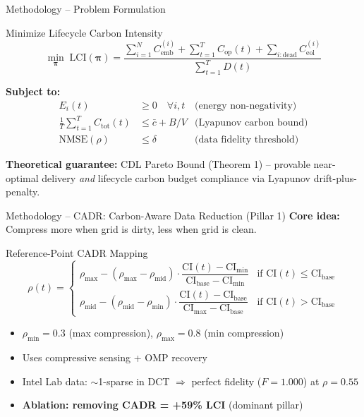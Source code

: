 \documentclass[aspectratio=169, 11pt]{beamer}
\begin{document}
\begin{frame}{Methodology -- Problem Formulation}
\begin{block}{Minimize Lifecycle Carbon Intensity}
\[
\min_{\boldsymbol{\pi}} \; \text{LCI}(\boldsymbol{\pi}) = \frac{\sum_{i=1}^{N} C_{\text{emb}}^{(i)} + \sum_{t=1}^{T} C_{\text{op}}(t) + \sum_{i:\text{dead}} C_{\text{eol}}^{(i)}}{\sum_{t=1}^{T} D(t)}
\]
\end{block}

\textbf{Subject to:}
\begin{align*}
    E_i(t) &\geq 0 \quad \forall i, t  &\text{(energy non-negativity)} \\
    \frac{1}{T}\sum_{t=1}^{T} C_{\text{tot}}(t) &\leq \bar{c} + B/V  &\text{(Lyapunov carbon bound)} \\
    \text{NMSE}(\rho) &\leq \delta \quad &\text{(data fidelity threshold)}
\end{align*}

\vspace{2mm}
\textbf{Theoretical guarantee:} CDL Pareto Bound (Theorem 1) -- provable near-optimal delivery \textit{and} lifecycle carbon budget compliance via Lyapunov drift-plus-penalty.
\end{frame}

\begin{frame}{Methodology -- CADR: Carbon-Aware Data Reduction (Pillar 1)}
\textbf{Core idea:} Compress more when grid is dirty, less when grid is clean.

\vspace{2mm}
\begin{block}{Reference-Point CADR Mapping}
\[
\rho(t) = \begin{cases}
    \rho_{\max} - (\rho_{\max} - \rho_{\text{mid}}) \cdot \dfrac{\text{CI}(t) - \text{CI}_{\min}}{\text{CI}_{\text{base}} - \text{CI}_{\min}} & \text{if } \text{CI}(t) \leq \text{CI}_{\text{base}} \\[8pt]
    \rho_{\text{mid}} - (\rho_{\text{mid}} - \rho_{\min}) \cdot \dfrac{\text{CI}(t) - \text{CI}_{\text{base}}}{\text{CI}_{\max} - \text{CI}_{\text{base}}} & \text{if } \text{CI}(t) > \text{CI}_{\text{base}}
\end{cases}
\]
\end{block}

\vspace{2mm}
\begin{itemize}
    \item $\rho_{\min} = 0.3$ (max compression), $\rho_{\max} = 0.8$ (min compression)
    \item Uses compressive sensing + OMP recovery
    \item Intel Lab data: $\sim$1-sparse in DCT $\Rightarrow$ perfect fidelity ($F = 1.000$) at $\rho = 0.55$
    \item \textbf{Ablation: removing CADR = +59\% LCI} (dominant pillar)
\end{itemize}
\end{frame}
\end{document}
